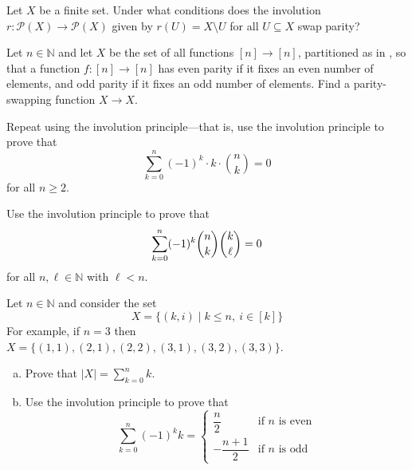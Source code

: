 \begin{exercise}
Let $X$ be a finite set. Under what conditions does the involution $r : \mathcal{P}(X) \to \mathcal{P}(X)$ given by $r(U) = X \setminus U$ for all $U \subseteq X$ swap parity?
\end{exercise}

\begin{exercise}
Let $n \in \mathbb{N}$ and let $X$ be the set of all functions $[n] \to [n]$, partitioned as in , so that a function $f : [n] \to [n]$ has even parity if it fixes an even number of elements, and odd parity if it fixes an odd number of elements. Find a parity-swapping function $X \to X$.
\end{exercise}

\begin{exercise}
Repeat  using the involution principle---that is, use the involution principle to prove that
\[ \sum_{k=0}^n (-1)^k \cdot k \cdot \binom{n}{k} = 0 \]
for all $n \ge 2$.
\end{exercise}

\begin{exercise}
Use the involution principle to prove that
\[ \sum_{k=0}^n (-1)^k \dbinom{n}{k} \dbinom{k}{\ell} = 0 \]
for all $n,\ell \in \mathbb{N}$ with $\ell < n$.
\end{exercise}



\begin{exercise}
Let $n \in \mathbb{N}$ and consider the set
\[ X = \{ (k,i) \mid k \le n,~ i \in [k] \} \]
For example, if $n=3$ then $X = \{ (1,1), (2,1), (2,2), (3,1), (3,2), (3,3) \}$.

\begin{enumerate}[(a)]
\item Prove that $|X| = \displaystyle \sum_{k=0}^n k$.
\item Use the involution principle to prove that
\[ \sum_{k=0}^n (-1)^k k = \begin{cases} \dfrac{n}{2} & \text{if $n$ is even} \\ -\dfrac{n+1}{2} & \text{if $n$ is odd } \end{cases} \]
\end{enumerate}
\end{exercise}


